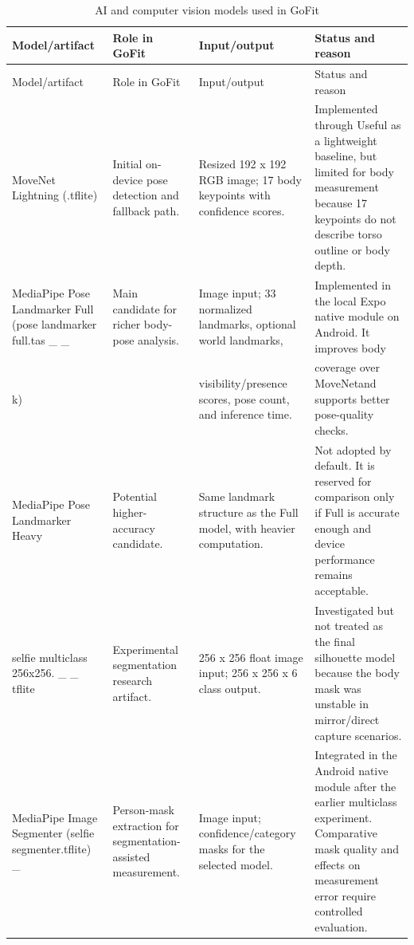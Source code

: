 \documentclass[12pt,a4paper,openany]{report}
\begin{document}
\begingroup
\scriptsize
\setlength{\tabcolsep}{3pt}
\renewcommand{\arraystretch}{1.20}
\setlength{\LTpre}{5pt}
\setlength{\LTpost}{10pt}
\begin{longtable}{|L{2.74cm}|L{5.18cm}|L{4.18cm}|L{2.30cm}|}
\caption{AI and computer vision models used in GoFit}\label{tab:pdf-58-26} \\
\hline
{}
Model/artifact & Role in GoFit & Input/output & Status and reason \\ \hline
\endfirsthead
\hline
{}
Model/artifact & Role in GoFit & Input/output & Status and reason \\ \hline
\endhead
MoveNet Lightning (.tflite) & Initial on-device pose detection and fallback path. & Resized 192 x 192 RGB image; 17 body keypoints with confidence scores. & Implemented through  Useful as a lightweight baseline, but limited for body measurement because 17 keypoints do not describe torso outline or body depth. \\ \hline
MediaPipe Pose Landmarker Full (pose landmarker full.tas \_ \_ & Main candidate for richer body-pose analysis. & Image input; 33 normalized landmarks, optional world landmarks, & Implemented in the local Expo native module on Android. It improves body \\ \hline
k) &  & visibility/presence scores, pose count, and inference time. & coverage over MoveNetand supports better pose-quality checks. \\ \hline
MediaPipe Pose Landmarker Heavy & Potential higher-accuracy candidate. & Same landmark structure as the Full model, with heavier computation. & Not adopted by default. It is reserved for comparison only if Full is accurate enough and device performance remains acceptable. \\ \hline
selfie multiclass 256x256. \_ \_ tflite & Experimental segmentation research artifact. & 256 x 256 float image input; 256 x 256 x 6 class output. & Investigated but not treated as the final silhouette model because the body mask was unstable in mirror/direct capture scenarios. \\ \hline
MediaPipe Image Segmenter (selfie segmenter.tflite) \_ & Person-mask extraction for segmentation-assisted measurement. & Image input; confidence/category masks for the selected model. & Integrated in the Android native module after the earlier multiclass experiment. Comparative mask quality and effects on measurement error require controlled evaluation. \\ \hline

\end{longtable}
\end{document}
